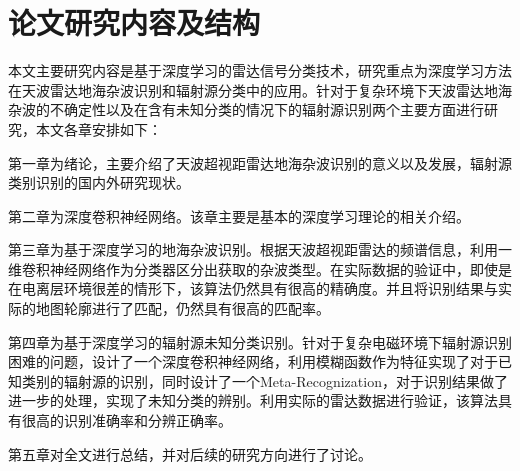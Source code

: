 
\section{论文研究内容及结构}

本文主要研究内容是基于深度学习的雷达信号分类技术，研究重点为深度学习方法在天波雷达地海杂波识别和辐射源分类中的应用。针对于复杂环境下天波雷达地海杂波的不确定性以及在含有未知分类的情况下的辐射源识别两个主要方面进行研究，本文各章安排如下：

第一章为绪论，主要介绍了天波超视距雷达地海杂波识别的意义以及发展，辐射源类别识别的国内外研究现状。

第二章为深度卷积神经网络。该章主要是基本的深度学习理论的相关介绍。

第三章为基于深度学习的地海杂波识别。根据天波超视距雷达的频谱信息，利用一维卷积神经网络作为分类器区分出获取的杂波类型。在实际数据的验证中，即使是在电离层环境很差的情形下，该算法仍然具有很高的精确度。并且将识别结果与实际的地图轮廓进行了匹配，仍然具有很高的匹配率。

第四章为基于深度学习的辐射源未知分类识别。针对于复杂电磁环境下辐射源识别困难的问题，设计了一个深度卷积神经网络，利用模糊函数作为特征实现了对于已知类别的辐射源的识别，同时设计了一个Meta-Recognization，对于识别结果做了进一步的处理，实现了未知分类的辨别。利用实际的雷达数据进行验证，该算法具有很高的识别准确率和分辨正确率。

第五章对全文进行总结，并对后续的研究方向进行了讨论。